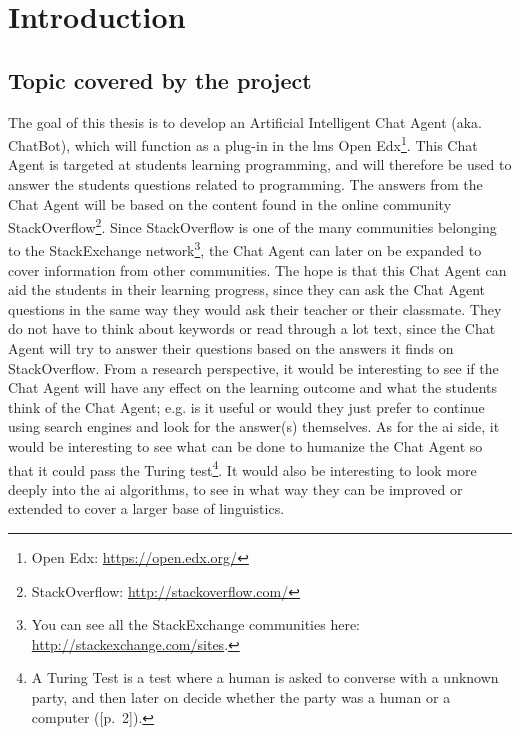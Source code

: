 \chapter{Introduction}
\label{chapter2:introduction}

\section{Topic covered by the project}
\label{chapter2:topic}
The goal of this thesis is to develop an Artificial Intelligent Chat Agent (aka. ChatBot), which will function as a plug-in in the \gls{lms} Open Edx\footnote{Open Edx: 
\url{https://open.edx.org/}}. This Chat Agent is targeted at students learning programming, and will therefore be used to answer the students questions related to programming. 
The answers from the Chat Agent will be based on the content found in the online community StackOverflow\footnote{StackOverflow: \url{http://stackoverflow.com/}}. 
Since StackOverflow is one of the many communities belonging to the StackExchange network\footnote{You can see all the StackExchange communities here: 
\url{http://stackexchange.com/sites}.}, the Chat Agent can later on be expanded to cover information from other communities.
\vspace{0.5em}\newline
The hope is that this Chat Agent can aid the students in their learning progress, since they can ask the Chat Agent questions in the same way they would ask their teacher or 
their classmate. They do not have to think about keywords or read through a lot text, since the Chat Agent will try to answer their questions based on the answers it finds 
on StackOverflow.
\vspace{0.5em}\newline
From a research perspective, it would be interesting to see if the Chat Agent will have any effect on the learning outcome and what the students think of the Chat Agent; e.g. is it 
useful or would they just prefer to continue using search engines and look for the answer(s) themselves. As for the \gls{ai} side, it would be interesting to see what can be done to
humanize the Chat Agent so that it could pass the Turing test\footnote{A Turing Test is a test where a human is asked to converse with a unknown party, and then later on decide
whether the party was a human or a computer ([p.~2]\cite{Russell2013}).}. It would also be interesting to look more deeply into the \gls{ai} algorithms, to see in what way they can 
be improved or extended to cover a larger base of linguistics.

